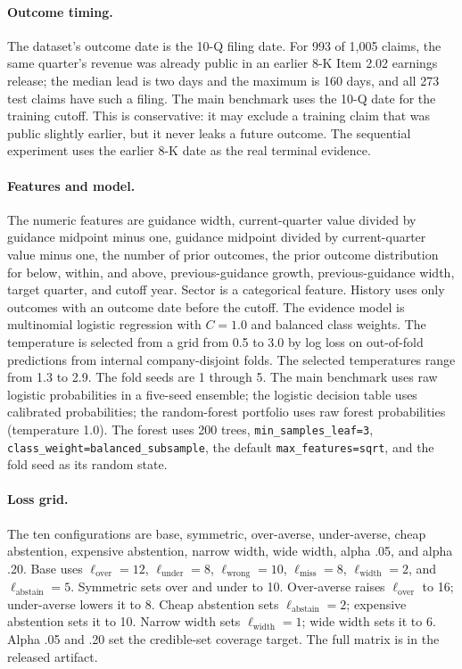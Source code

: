 \documentclass[11pt]{article}
\begin{document}
\paragraph{Outcome timing.}
The dataset's outcome date is the 10-Q filing date. For 993 of 1,005 claims, the same quarter's revenue was already public in an earlier 8-K Item 2.02 earnings release; the median lead is two days and the maximum is 160 days, and all 273 test claims have such a filing. The main benchmark uses the 10-Q date for the training cutoff. This is conservative: it may exclude a training claim that was public slightly earlier, but it never leaks a future outcome. The sequential experiment uses the earlier 8-K date as the real terminal evidence.

\paragraph{Features and model.}
The numeric features are guidance width, current-quarter value divided by guidance midpoint minus one, guidance midpoint divided by current-quarter value minus one, the number of prior outcomes, the prior outcome distribution for below, within, and above, previous-guidance growth, previous-guidance width, target quarter, and cutoff year. Sector is a categorical feature. History uses only outcomes with an outcome date before the cutoff. The evidence model is multinomial logistic regression with $C=1.0$ and balanced class weights. The temperature is selected from a grid from 0.5 to 3.0 by log loss on out-of-fold predictions from internal company-disjoint folds. The selected temperatures range from 1.3 to 2.9. The fold seeds are 1 through 5. The main benchmark uses raw logistic probabilities in a five-seed ensemble; the logistic decision table uses calibrated probabilities; the random-forest portfolio uses raw forest probabilities (temperature 1.0). The forest uses 200 trees, \texttt{min\_samples\_leaf=3}, \texttt{class\_weight=balanced\_subsample}, the default \texttt{max\_features=sqrt}, and the fold seed as its random state.

\paragraph{Loss grid.}
The ten configurations are base, symmetric, over-averse, under-averse, cheap abstention, expensive abstention, narrow width, wide width, alpha .05, and alpha .20. Base uses $\ell_{\text{over}}=12$, $\ell_{\text{under}}=8$, $\ell_{\text{wrong}}=10$, $\ell_{\text{miss}}=8$, $\ell_{\text{width}}=2$, and $\ell_{\text{abstain}}=5$. Symmetric sets over and under to 10. Over-averse raises $\ell_{\text{over}}$ to 16; under-averse lowers it to 8. Cheap abstention sets $\ell_{\text{abstain}}=2$; expensive abstention sets it to 10. Narrow width sets $\ell_{\text{width}}=1$; wide width sets it to 6. Alpha .05 and .20 set the credible-set coverage target. The full matrix is in the released artifact.
\end{document}

